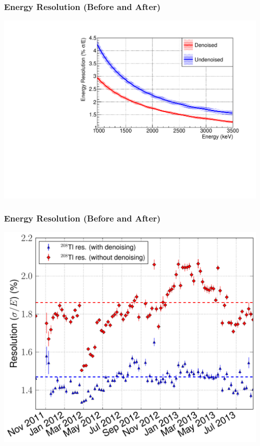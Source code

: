 \documentclass{beamer}
\begin{document}
\begin{frame}
\begin{center}
\frametitle{Energy Resolution (Before and After)}
\end{center}
\vspace{0.5cm}
\begin{center}
\includegraphics[keepaspectratio=true,width=\textwidth,clip=true,trim=0mm 0mm 10mm 10mm]{ResolutionFunctionComparison_relative.pdf}
\end{center}
\end{frame}

\begin{frame}
\begin{center}
\frametitle{Energy Resolution (Before and After)}
\end{center}
\vspace{0.6cm}
\begin{center}
\includegraphics[keepaspectratio=true,width=.95\textwidth]{RotatedReso_denoised_compVsTime.pdf}
\end{center}
\end{frame}
\end{document}
